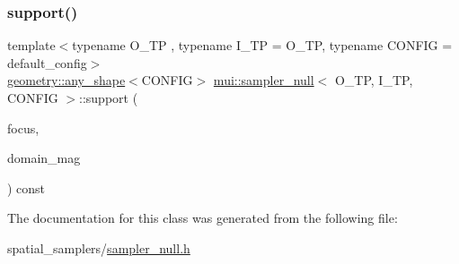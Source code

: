 \mbox{\label{classmui_1_1sampler__null_a1d84967f446a79cbe176c78248708536}} 
\subsubsection{\texorpdfstring{support()}{support()}}
{\footnotesize\ttfamily template$<$typename O\+\_\+\+TP , typename I\+\_\+\+TP  = O\+\_\+\+TP, typename C\+O\+N\+F\+IG  = default\+\_\+config$>$ \\
\hyperlink{classmui_1_1geometry_1_1any__shape}{geometry\+::any\+\_\+shape}$<$C\+O\+N\+F\+IG$>$ \hyperlink{classmui_1_1sampler__null}{mui\+::sampler\+\_\+null}$<$ O\+\_\+\+TP, I\+\_\+\+TP, C\+O\+N\+F\+IG $>$\+::support (\begin{DoxyParamCaption}\item[{\hyperlink{classmui_1_1sampler__null_a985eebd74be60f0c554d6ab50914e99b}{point\+\_\+type}}]{focus,  }\item[{\hyperlink{classmui_1_1sampler__null_a00fccc2bca221ca91668d49c771b33bc}{R\+E\+AL}}]{domain\+\_\+mag }\end{DoxyParamCaption}) const\hspace{0.3cm}{\ttfamily [inline]}}



The documentation for this class was generated from the following file\+:\begin{DoxyCompactItemize}
\item 
spatial\+\_\+samplers/\hyperlink{sampler__null_8h}{sampler\+\_\+null.\+h}\end{DoxyCompactItemize}
